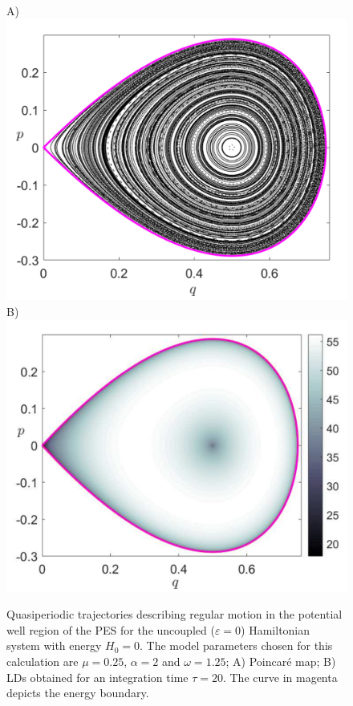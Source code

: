 \documentclass{ws-ijbc}
\begin{document}
\begin{figure}[!ht]
	\begin{center}
		A)\includegraphics[scale=0.37]{fig8a}
		B)\includegraphics[scale=0.375]{fig8b}
	\end{center}

	\caption{Quasiperiodic trajectories describing regular motion in the potential well region of the PES for the uncoupled ($\varepsilon = 0$) Hamiltonian system with energy $H_0 = 0$. The model parameters chosen for this calculation are $\mu = 0.25$, $\alpha = 2$ and $\omega = 1.25$; A) Poincar\'e map; B) LDs obtained for an integration time $\tau = 20$. The curve in magenta depicts the energy boundary.}
	\label{LD_PS_uncoupled}
\end{figure}
\end{document}
